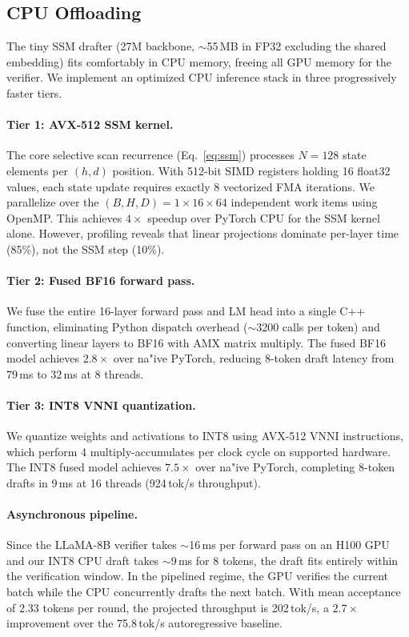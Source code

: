 \subsection{CPU Offloading}
\label{sec:cpu}

The tiny SSM drafter (27M backbone, $\sim$55\,MB in FP32 excluding the shared embedding) fits comfortably in CPU memory, freeing all GPU memory for the verifier.
We implement an optimized CPU inference stack in three progressively faster tiers.

\paragraph{Tier 1: AVX-512 SSM kernel.}
The core selective scan recurrence (Eq.~\ref{eq:ssm}) processes $N\!=\!128$ state elements per $(h,d)$ position.
With 512-bit SIMD registers holding 16 float32 values, each state update requires exactly 8 vectorized FMA iterations.
We parallelize over the $(B, H, D)\!=\!1{\times}16{\times}64$ independent work items using OpenMP.
This achieves $4\times$ speedup over PyTorch CPU for the SSM kernel alone.
However, profiling reveals that linear projections dominate per-layer time (85\%), not the SSM step (10\%).

\paragraph{Tier 2: Fused BF16 forward pass.}
We fuse the entire 16-layer forward pass and LM head into a single C++ function, eliminating Python dispatch overhead ($\sim$3200 calls per token) and converting linear layers to BF16 with AMX matrix multiply.
The fused BF16 model achieves $2.8\times$ over na"ive PyTorch, reducing 8-token draft latency from 79\,ms to 32\,ms at 8 threads.

\paragraph{Tier 3: INT8 VNNI quantization.}
We quantize weights and activations to INT8 using AVX-512 VNNI instructions, which perform 4 multiply-accumulates per clock cycle on supported hardware.
The INT8 fused model achieves $7.5\times$ over na"ive PyTorch, completing 8-token drafts in 9\,ms at 16 threads (924\,tok/s throughput).

\paragraph{Asynchronous pipeline.}
Since the LLaMA-8B verifier takes $\sim$16\,ms per forward pass on an H100 GPU and our INT8 CPU draft takes $\sim$9\,ms for 8 tokens, the draft fits entirely within the verification window.
In the pipelined regime, the GPU verifies the current batch while the CPU concurrently drafts the next batch.
With mean acceptance of 2.33 tokens per round, the projected throughput is 202\,tok/s, a $2.7\times$ improvement over the 75.8\,tok/s autoregressive baseline.

